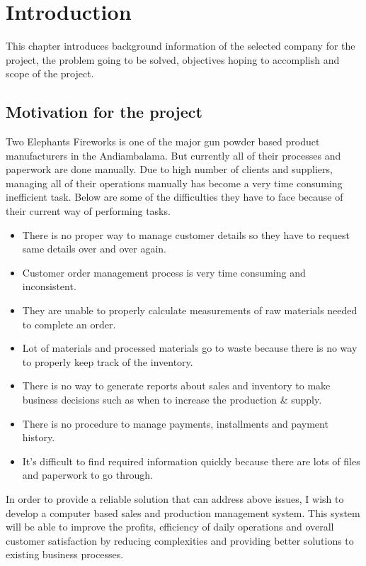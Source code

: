 \documentclass[12pt]{report}
\begin{document}
\chapter{Introduction}
This chapter introduces background information of the selected company for the project, the problem going to be solved, objectives hoping to accomplish and scope of the project.

\section{Motivation for the project}
Two Elephants Fireworks is one of the major gun powder based product manufacturers in  the Andiambalama. But currently all of their processes and paperwork are done manually. Due to high number of clients and suppliers, managing all of their operations manually has become a very time consuming inefficient task. Below are some of the difficulties they have to face because of their current way of performing tasks.

\begin{itemize}
	\item There is no proper way to manage customer details so they have to request same details over and over again.
	\item Customer order management process is very time consuming and inconsistent.
	\item They are unable to properly calculate measurements of raw materials needed to complete an order.
	\item Lot of materials and processed materials go to waste because there is no way to properly keep track of the inventory.
	\item There is no way to generate reports about sales and inventory to make business decisions such as when to increase the production \& supply.
	\item There is no procedure to manage payments, installments and payment history.
	\item It’s difficult to find required information quickly because there are lots of files and paperwork to go through.
\end{itemize}

In order to provide a reliable solution that can address above issues, I wish to develop a computer based sales and production management system. This system will be able to improve the profits, efficiency of daily operations and overall customer satisfaction by reducing complexities and providing better solutions to existing business processes.
\end{document}
